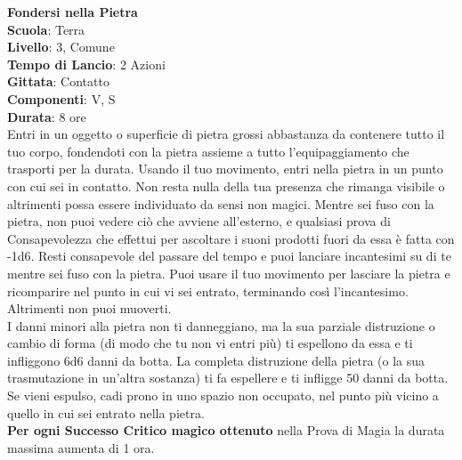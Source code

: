 \begin{multicols}{2}
\medskip\textbf{Fondersi nella Pietra}\\
\textbf{Scuola}: Terra\\
\textbf{Livello}: 3, Comune\\
\textbf{Tempo di Lancio}: 2 Azioni\\
\textbf{Gittata}: Contatto\\
\textbf{Componenti}: V, S\\
\textbf{Durata}: 8 ore\\
Entri in un oggetto o superficie di pietra grossi abbastanza da contenere tutto il tuo corpo, fondendoti con la pietra assieme a tutto l'equipaggiamento che trasporti per la durata. Usando il tuo movimento, entri nella pietra in un punto con cui sei in contatto. Non resta nulla della tua presenza che rimanga visibile o altrimenti possa essere individuato da sensi non magici. Mentre sei fuso con la pietra, non puoi vedere ciò che avviene all'esterno, e qualsiasi prova di Consapevolezza che effettui per ascoltare i suoni prodotti fuori da essa è fatta con -1d6. Resti consapevole del passare del tempo e puoi lanciare incantesimi su di te mentre sei fuso con la pietra. Puoi usare il tuo movimento per lasciare la pietra e ricomparire nel punto in cui vi sei entrato, terminando così l'incantesimo. Altrimenti non puoi muoverti.\\
I danni minori alla pietra non ti danneggiano, ma la sua parziale distruzione o cambio di forma (di modo che tu non vi entri più) ti espellono da essa e ti infliggono 6d6 danni da botta. La completa distruzione della pietra (o la sua trasmutazione in un'altra sostanza) ti fa espellere e ti infligge 50 danni da botta. Se vieni espulso, cadi prono in uno spazio non occupato, nel punto più vicino a quello in cui sei entrato nella pietra.\\
\textbf{Per ogni Successo Critico magico ottenuto} nella Prova di Magia la durata massima aumenta di 1 ora.


\end{multicols}

